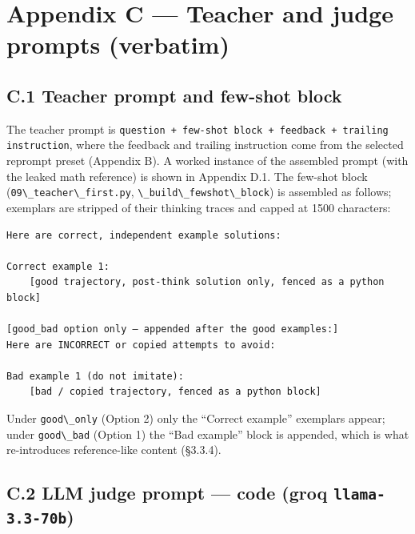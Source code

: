 \section{Appendix C --- Teacher and judge prompts (verbatim)}\label{appendix-c-teacher-and-judge-prompts-verbatim}

\subsection{C.1 Teacher prompt and few-shot block}\label{c.1-teacher-prompt-and-few-shot-block}

The teacher prompt is \passthrough{\lstinline!question + few-shot block + feedback + trailing instruction!}, where the feedback and trailing instruction come from the selected reprompt preset (Appendix B). A worked instance of the assembled prompt (with the leaked math reference) is shown in Appendix D.1. The few-shot block (\passthrough{\lstinline!09\_teacher\_first.py!}, \passthrough{\lstinline!\_build\_fewshot\_block!}) is assembled as follows; exemplars are stripped of their thinking traces and capped at 1500 characters:

\begin{lstlisting}
Here are correct, independent example solutions:

Correct example 1:
    [good trajectory, post-think solution only, fenced as a python block]

[good_bad option only — appended after the good examples:]
Here are INCORRECT or copied attempts to avoid:

Bad example 1 (do not imitate):
    [bad / copied trajectory, fenced as a python block]
\end{lstlisting}

Under \passthrough{\lstinline!good\_only!} (Option 2) only the ``Correct example'' exemplars appear; under \passthrough{\lstinline!good\_bad!} (Option 1) the ``Bad example'' block is appended, which is what re-introduces reference-like content (§3.3.4).

\subsection{\texorpdfstring{C.2 LLM judge prompt --- code (groq \texttt{llama-3.3-70b})}{C.2 LLM judge prompt --- code (groq llama-3.3-70b)}}\label{c.2-llm-judge-prompt-code-groq-llama-3.3-70b}

